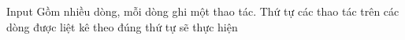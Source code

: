 Input
Gồm nhiều dòng, mỗi dòng ghi một thao tác. Thứ tự các thao tác trên các dòng được liệt kê theo đúng thứ tự sẽ thực hiện